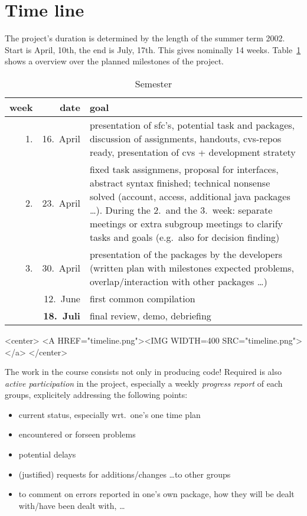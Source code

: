 
\section*{Time line}
\label{sec:timeline}



The project's duration is determined by the length of the summer term 2002.
Start is April, 10th, the end is July, 17th. This gives nominally 14 weeks.
Table~\ref{tab:semester} shows a overview over the planned milestones of
the project.

\begin{table}[htbp]
  \begin{center}
    \begin{tabular}{rrp{9cm}}
      week & date & goal
      \\\hline
      1. & 16.\ April  &  presentation of sfc's, potential task and packages,
      discussion of assignments, handouts, cvs-repos ready, presentation
      of cvs + development stratety
      \\
      2. & 23.\ April  &  fixed task assignmens, proposal for interfaces,
      abstract syntax finished; technical  nonsense solved (account,
      access, additional java packages \ldots).
      During the 2.\ and the 3.\ week: separate meetings or extra subgroup
      meetings to clarify tasks and goals (e.g.\ also  for decision finding)
      \\
      3. & 30.\ April & 
      presentation of the packages by the developers (written plan with
      milestones expected problems, overlap/interaction with other packages
      \ldots)
      \\
      & 12.\ June &
      first common compilation
      \\
       & \textbf{18.\ Juli} & final review, demo, debriefing
    \end{tabular}
    \caption{Semester}
    \label{tab:semester}
  \end{center}
\end{table}


\begin{rawhtml}
  <center>
  <A HREF="timeline.png"><IMG  WIDTH=400 SRC="timeline.png"> </a>
  </center>
\end{rawhtml}



The work in the course consists not only in producing code!  Required is
also \emph{active participation} in the project, especially a weekly
\emph{progress report} of each groups, explicitely addressing the following
points:
\begin{itemize}
\item current status, especially wrt.\ one's one time plan
\item encountered or forseen problems
\item potential delays
\item (justified) requests for additions/changes \ldots to other groups
\item to comment on errors reported in one's own package, how they will be
  dealt with/have been dealt with, \ldots
\end{itemize}



